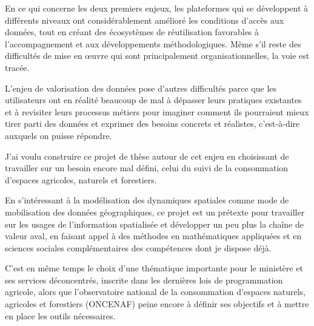 En ce qui concerne les deux premiers enjeux, les plateformes qui se
développent à différents niveaux ont considérablement amélioré les conditions
d'accès aux données, tout en créant des écosystèmes de réutilisation
favorables à l'accompagnement et aux développements méthodologiques. Même s'il
reste des difficultés de mise en œuvre qui sont principalement
organisationnelles, la voie est tracée.

L'enjeu de valorisation des données pose d'autres difficultés parce que les
utilisateurs ont en réalité beaucoup de mal à dépasser leurs pratiques
existantes et à revisiter leurs processus métiers pour imaginer comment ils
pourraient mieux tirer parti des données et exprimer des besoins concrets et
réalistes, c'est-à-dire auxquels on puisse répondre.

J'ai voulu construire ce projet de thèse autour de cet enjeu en choisissant de
travailler sur un besoin encore mal défini, celui du suivi de la consommation
d'espaces agricoles, naturels et forestiers.

En s'intéressant à la modélisation des dynamiques spatiales comme mode de
mobilisation des données géographiques, ce projet est un prétexte pour
travailler sur les usages de l'information spatialisée et développer un peu
plus la chaîne de valeur aval, en faisant appel à des méthodes en
mathématiques appliquées et en sciences sociales complémentaires des
compétences dont je dispose déjà.

C'est en même temps le choix d'une thématique importante pour le ministère et
ses services déconcentrés, inscrite dans les dernières lois de programmation
agricole, alors que l'observatoire national de la consommation d'espaces
naturels, agricoles et forestiers (ONCENAF) peine encore à définir ses
objectifs et à mettre en place les outils nécessaires.